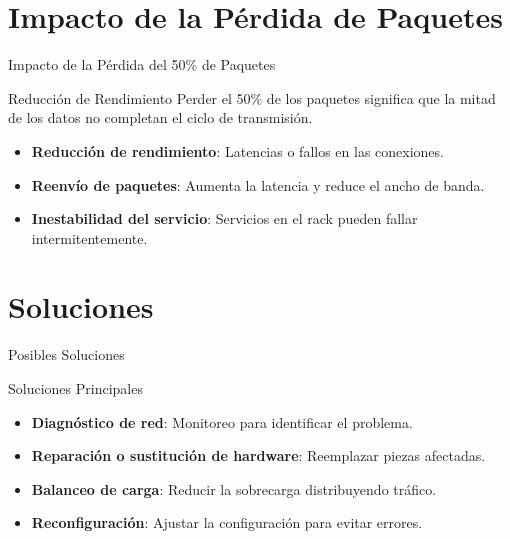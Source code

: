 \documentclass{beamer}
\begin{document}
\section{Impacto de la Pérdida de Paquetes}
\begin{frame}{Impacto de la Pérdida del 50\% de Paquetes}
    \begin{block}{Reducción de Rendimiento}
        Perder el 50\% de los paquetes significa que la mitad de los datos no completan el ciclo de transmisión.
    \end{block}
    \begin{itemize}
        \item \textbf{Reducción de rendimiento}: Latencias o fallos en las conexiones.
        \item \textbf{Reenvío de paquetes}: Aumenta la latencia y reduce el ancho de banda.
        \item \textbf{Inestabilidad del servicio}: Servicios en el rack pueden fallar intermitentemente.
    \end{itemize}
\end{frame}

\section{Soluciones}
\begin{frame}{Posibles Soluciones}
    \begin{block}{Soluciones Principales}
        \begin{itemize}
            \item \textbf{Diagnóstico de red}: Monitoreo para identificar el problema.
            \item \textbf{Reparación o sustitución de hardware}: Reemplazar piezas afectadas.
            \item \textbf{Balanceo de carga}: Reducir la sobrecarga distribuyendo tráfico.
            \item \textbf{Reconfiguración}: Ajustar la configuración para evitar errores.
        \end{itemize}
    \end{block}
\end{frame}
\end{document}
